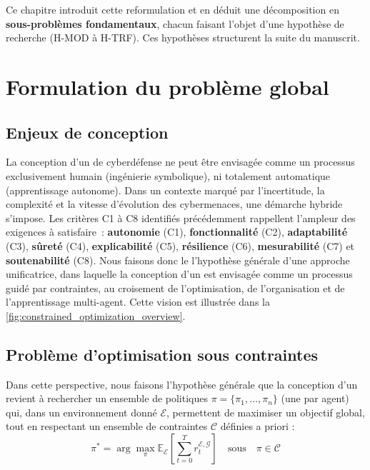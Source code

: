 Ce chapitre introduit cette reformulation et en déduit une décomposition en \textbf{sous-problèmes fondamentaux}, chacun faisant l’objet d’une hypothèse de recherche (H-MOD à H-TRF). Ces hypothèses structurent la suite du manuscrit.

\section{Formulation du problème global}

\subsection{Enjeux de conception}

La conception d’un  de cyberdéfense ne peut être envisagée comme un processus exclusivement humain (ingénierie symbolique), ni totalement automatique (apprentissage autonome). Dans un contexte marqué par l’incertitude, la complexité et la vitesse d’évolution des cybermenaces, une démarche hybride s’impose.
%
Les critères C1 à C8 identifiés précédemment rappellent l’ampleur des exigences à satisfaire~: \textbf{autonomie} (C1), \textbf{fonctionnalité} (C2), \textbf{adaptabilité} (C3), \textbf{sûreté} (C4), \textbf{explicabilité} (C5), \textbf{résilience} (C6), \textbf{mesurabilité} (C7) et \textbf{soutenabilité} (C8).
%
Nous faisons donc le l'hypothèse générale d’une approche unificatrice, dans laquelle la conception d’un  est envisagée comme un processus guidé par contraintes, au croisement de l’optimisation, de l’organisation et de l’apprentissage multi-agent. Cette vision est illustrée dans la \autoref{fig:constrained_optimization_overview}.

\subsection{Problème d’optimisation sous contraintes}

Dans cette perspective, nous faisons l'hypothèse générale que la conception d’un  revient à rechercher un ensemble de politiques $\pi = \{\pi_1, \dots, \pi_n\}$ (une par agent) qui, dans un environnement donné $\mathcal{E}$, permettent de maximiser un objectif global, tout en respectant un ensemble de contraintes $\mathcal{C}$ définies a priori :
%
\[
  \pi^* = \arg\max_{\pi} \mathbb{E}_{\mathcal{E}} \left[ \sum_{t=0}^{T} r^{\mathcal{E}, \mathcal{G}}_t \right] \quad \text{sous} \quad \pi \in \mathcal{C}
\]

